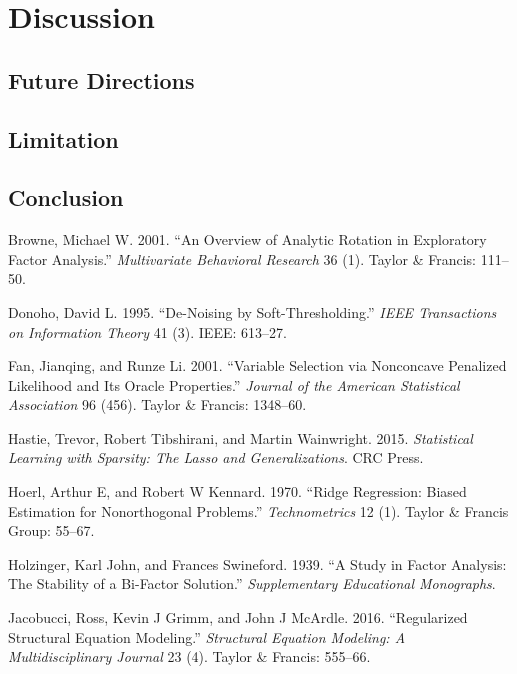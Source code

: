 \documentclass[article]{jss}
\begin{document}
\section{Discussion}\label{discussion}

\subsection{Future Directions}\label{future-directions}

\subsection{Limitation}\label{limitation}

\subsection*{Conclusion}\label{conclusion}

\hypertarget{refs}{}
\hypertarget{ref-browne2001}{}
Browne, Michael W. 2001. ``An Overview of Analytic Rotation in
Exploratory Factor Analysis.'' \emph{Multivariate Behavioral Research}
36 (1). Taylor \& Francis: 111--50.

\hypertarget{ref-donoho1995noising}{}
Donoho, David L. 1995. ``De-Noising by Soft-Thresholding.'' \emph{IEEE
Transactions on Information Theory} 41 (3). IEEE: 613--27.

\hypertarget{ref-fan2001variable}{}
Fan, Jianqing, and Runze Li. 2001. ``Variable Selection via Nonconcave
Penalized Likelihood and Its Oracle Properties.'' \emph{Journal of the
American Statistical Association} 96 (456). Taylor \& Francis: 1348--60.

\hypertarget{ref-hastie2015statistical}{}
Hastie, Trevor, Robert Tibshirani, and Martin Wainwright. 2015.
\emph{Statistical Learning with Sparsity: The Lasso and
Generalizations}. CRC Press.

\hypertarget{ref-hoerl1970}{}
Hoerl, Arthur E, and Robert W Kennard. 1970. ``Ridge Regression: Biased
Estimation for Nonorthogonal Problems.'' \emph{Technometrics} 12 (1).
Taylor \& Francis Group: 55--67.

\hypertarget{ref-holzinger1939study}{}
Holzinger, Karl John, and Frances Swineford. 1939. ``A Study in Factor
Analysis: The Stability of a Bi-Factor Solution.'' \emph{Supplementary
Educational Monographs}.

\hypertarget{ref-jacobucci2016regularized}{}
Jacobucci, Ross, Kevin J Grimm, and John J McArdle. 2016. ``Regularized
Structural Equation Modeling.'' \emph{Structural Equation Modeling: A
Multidisciplinary Journal} 23 (4). Taylor \& Francis: 555--66.
\end{document}
